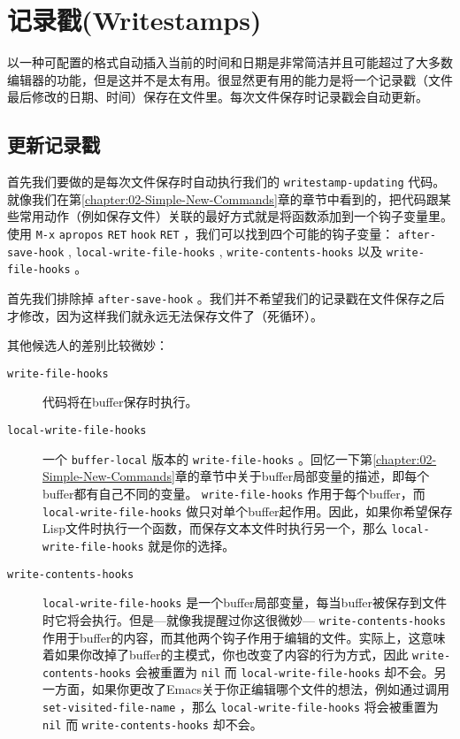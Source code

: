 \section{记录戳(Writestamps)}
\label{section:04-Writestamps}

以一种可配置的格式自动插入当前的时间和日期是非常简洁并且可能超过了大多数编辑器的功能，但是这并不是太有用。很显然更有用的能力是将一个记录戳（文件最后修改的日期、时间）保存在文件里。每次文件保存时记录戳会自动更新。

\subsection{更新记录戳}
\label{section:04-Updating-Writestamps}

首先我们要做的是每次文件保存时自动执行我们的 \texttt{writestamp-updating} 代码。就像我们在第\ref{chapter:02-Simple-New-Commands}章的章节中看到的，把代码跟某些常用动作（例如保存文件）关联的最好方式就是将函数添加到一个钩子变量里。使用 \verb|M-x| \texttt{apropos} \verb|RET| \texttt{hook} \verb|RET| ，我们可以找到四个可能的钩子变量： \texttt{after-save-hook} , \texttt{local-write-file-hooks} , \texttt{write-contents-hooks} 以及 \texttt{write-file-hooks} 。

首先我们排除掉 \texttt{after-save-hook} 。我们并不希望我们的记录戳在文件保存之后才修改，因为这样我们就永远无法保存文件了（死循环）。

其他候选人的差别比较微妙：

\begin{description}
  \item[\texttt{write-file-hooks}] 代码将在buffer保存时执行。
  \item[\texttt{local-write-file-hooks}] 一个 \texttt{buffer-local} 版本的 \texttt{write-file-hooks} 。回忆一下第\ref{chapter:02-Simple-New-Commands}章的章节中关于buffer局部变量的描述，即每个buffer都有自己不同的变量。 \texttt{write-file-hooks} 作用于每个buffer，而 \texttt{local-write-file-hooks} 做只对单个buffer起作用。因此，如果你希望保存Lisp文件时执行一个函数，而保存文本文件时执行另一个，那么 \texttt{local-write-file-hooks} 就是你的选择。
  \item[\texttt{write-contents-hooks}] \texttt{local-write-file-hooks} 是一个buffer局部变量，每当buffer被保存到文件时它将会执行。但是---就像我提醒过你这很微妙--- \texttt{write-contents-hooks} 作用于buffer的内容，而其他两个钩子作用于编辑的文件。实际上，这意味着如果你改掉了buffer的主模式，你也改变了内容的行为方式，因此 \texttt{write-contents-hooks} 会被重置为 \texttt{nil} 而 \texttt{local-write-file-hooks} 却不会。另一方面，如果你更改了Emacs关于你正编辑哪个文件的想法，例如通过调用 \texttt{set-visited-file-name} ，那么 \texttt{local-write-file-hooks} 将会被重置为 \texttt{nil} 而 \texttt{write-contents-hooks} 却不会。
\end{description}

